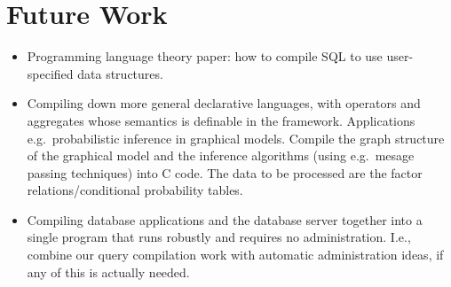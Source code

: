\documentclass[10pt,twocolumn]{article}
\begin{document}
\section{Future Work}


\begin{itemize}
\item
Programming language theory paper: how to compile SQL to use user-specified
data structures.

\item
Compiling down more general declarative languages, with operators and
aggregates whose semantics is definable in the framework. Applications e.g.\
probabilistic inference in graphical models. Compile the graph structure
of the graphical model and the inference algorithms (using e.g.\ mesage
passing techniques) into C code. The data to be processed are the factor
relations/conditional probability tables.

\item
Compiling database applications and the database server together into a single
program that runs robustly and requires no administration. I.e., combine
our query compilation work with automatic administration ideas, if any of
this is actually needed.
\end{itemize}



%
%
\end{document}
